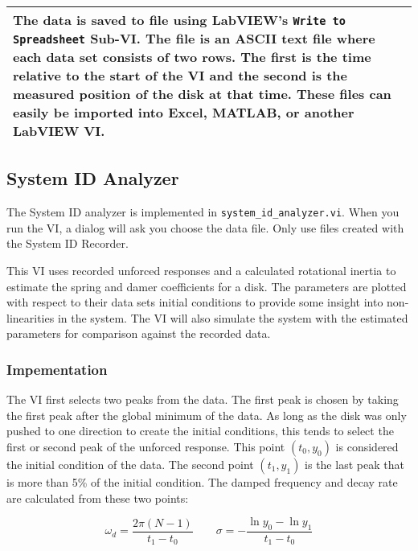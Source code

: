 \begin{center}\begin{tabular}{|p{}|}
\hline The data is saved to file using LabVIEW's \texttt{Write to
Spreadsheet} Sub-VI.  The file is an ASCII text file where each data
set consists of two rows.  The first is the time relative to the start
of the VI and the second is the measured position of the disk at
that time.  These files can easily be imported into Excel, MATLAB, or
another LabVIEW VI. \\
\hline
\end{tabular}\end{center}

\subsection{System ID Analyzer}

The System ID analyzer is implemented in
\texttt{system\_id\_analyzer.vi}.  When you run the VI, a dialog will
ask you choose the data file.  Only use files created with the System
ID Recorder. 
   
This VI uses recorded unforced responses and a calculated rotational
inertia to estimate the spring and damer coefficients for a disk.  The
parameters are plotted with respect to their data sets initial
conditions to provide some insight into non-linearities in the
system.  The VI will also simulate the system with the estimated
parameters for comparison against the recorded data.

\subsubsection{Impementation}
    
The VI first selects two peaks from the data.  The first peak is
chosen by taking the first peak after the global minimum of the data.
As long as the disk was only pushed to one direction to create the
initial conditions, this tends to select the first or second peak of
the unforced response.  This point $(t_0,y_0)$ is considered the
initial condition of the data.  The second point $(t_1, y_1)$ is the
last peak that is more than 5\% of the initial condition.  The damped
frequency and decay rate are calculated from these two points:

\begin{equation}
\omega_d = \frac{2\pi(N-1)}{t_1-t_0}
\qquad
\sigma = - \frac{\ln{y_0}-\ln{y_1}}{t_1 - t_0}
\end{equation}

